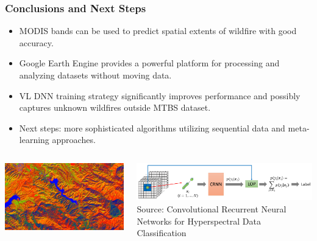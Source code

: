 \documentclass{beamer}
\begin{document}
\begin{frame}
  \frametitle{Conclusions and Next Steps}
\scriptsize
	      \begin{itemize}
               \item MODIS bands can be used to predict spatial extents of wildfire with good accuracy.

	       \item Google Earth Engine provides a powerful platform for processing and analyzing datasets without moving data.
	       \item VL DNN training strategy significantly improves performance and possibly captures unknown wildfires outside MTBS dataset. 
	       \item Next steps: more sophisticated algorithms 
utilizing sequential data and meta-learning approaches.  
              \end{itemize}

 
 
     \begin{columns}[T]
    \begin{column}{.5\textwidth}
     
   \includegraphics[width=1.0\textwidth]{figs/gee_spectral.png}

   \centering
   \vspace{-0.2cm}

    \end{column}
    \begin{column}{.5\textwidth}
    \vspace{-0.2cm}
    
 
    \includegraphics[width=1.0\textwidth]{figs/crnn_rs.png}
\\
\tiny 
\centering
Source: Convolutional Recurrent Neural Networks for
Hyperspectral Data Classification \cite{rs9030298}
   
    \end{column}
  \end{columns}
\end{frame}
\end{document}
